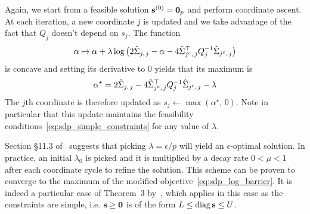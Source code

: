 \bigbreak
Again, we start from a feasible solution $\mathbf{s}^{(0)} = \mathbf{0}_p$ and perform coordinate ascent.
At each iteration, a new coordinate $j$ is updated
and we take advantage of the fact that $Q_j$ doesn't depend on $s_j$.
The function
\begin{equation*}
    \alpha \mapsto \alpha
        + \lambda\log\big( 2\hat{\Sigma}_{j,\, j} - \alpha - 4\hat{\Sigma}_{j^c,\, j}^\top Q_j^{-1} \hat{\Sigma}_{j^c,\, j} \big)
\end{equation*}
is concave and setting its derivative to $0$ yields that its maximum is
\begin{equation*}
    \alpha^\star = 2\hat{\Sigma}_{j,\, j} - 4\hat{\Sigma}_{j^c,\, j}^\top Q_j^{-1} \hat{\Sigma}_{j^c,\, j} - \lambda
\end{equation*}
The $j$th coordinate is therefore updated as $s_j \leftarrow \max\left( \alpha^\star,\, 0 \right)$.
Note in particular that this update maintains the feasibility
conditions~\ref{eq:sdp_simple_constraints} for any value of $\lambda$.

Section §11.3 of~\cite{convex_optimization} suggests that picking $\lambda = \epsilon / p$ will yield an
$\epsilon$-optimal solution.
In practice, an initial $\lambda_0$ is picked and it is multiplied by a decay rate
$0 < \mu < 1$ after each coordinate cycle to refine the solution.
This scheme can be proven to converge to the maximum
of the modified objective~\ref{eq:sdp_log_barrier}.
It is indeed a particular case of Theorem~3 by~\cite{block_coordinate_sdp},
which applies in this case as the constraints are simple,
i.e. $\mathbf{s} \geq \mathbf{0}$ is of the form $L \leq \operatorname*{diag}\mathbf{s} \leq U$.

